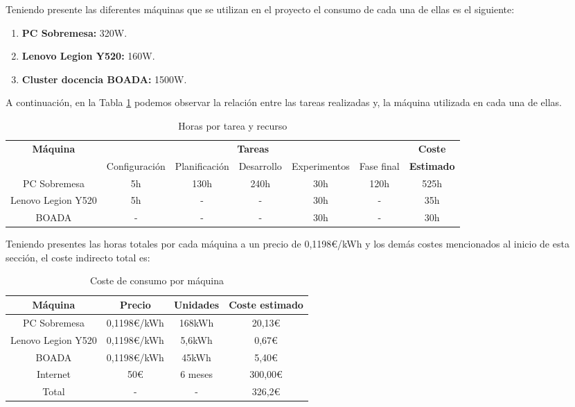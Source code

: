\documentclass[titlepage,10.5pt]{report}
\begin{document}
Teniendo presente las diferentes máquinas que se utilizan en el proyecto el consumo de cada una de ellas es el siguiente:

\begin{enumerate}
	\item \textbf{PC Sobremesa:} 320W.
	\item \textbf{Lenovo Legion Y520:} 160W.
	\item \textbf{Cluster docencia BOADA:} 1500W.
\end{enumerate}

A continuación, en la Tabla \ref{ci_1} podemos observar la relación entre las tareas realizadas y, la máquina utilizada en cada una de ellas.

\begin{table}[H]
	\centering
	\begin{tabular}{|c|c|c|c|c|c|c|}
	\hline
	\multirow{2}{*}{\textbf{Máquina}} & \multicolumn{5}{c|}{\textbf{Tareas}} & \textbf{Coste} \\ \cline{2-6} 
			& Configuración & Planificación & Desarrollo & Experimentos & Fase final & \textbf{Estimado} \\ \hline \hline
		PC Sobremesa 			& 5h  & 130h & 240h & 30h &	120h & 525h \\ \hline
		Lenovo Legion Y520 		& 5h  & -	 & -    & 30h &	-	 & 35h\\ \hline
		BOADA 					& -	  & -	 & -    & 30h &	-	 & 30h\\ \hline
	\end{tabular}
	\caption{Horas por tarea y recurso}
	\label{ci_1}
\end{table}

Teniendo presentes las horas totales por cada máquina a un precio de 0,1198€/kWh y los demás costes mencionados al inicio de esta sección, el coste indirecto total es:

\begin{table}[H]
	\centering
	\begin{tabular}{|c|c|c|c|}
		\hline
		\textbf{Máquina} & \textbf{Precio} & \textbf{Unidades} & \textbf{Coste estimado} \\ \hline \hline
		PC Sobremesa 			& 0,1198€/kWh & 168kWh 	& 20,13€ 	\\ \hline
		Lenovo Legion Y520 		& 0,1198€/kWh & 5,6kWh 	& 0,67€ 	\\ \hline
		BOADA 					& 0,1198€/kWh & 45kWh 	& 5,40€ 	\\ \hline 
		Internet				& 50€		  & 6 meses	& 300,00€ 	\\ \hline \hline
		Total 					& - 		  & -		& 326,2€	\\ \hline
	\end{tabular}
	\caption{Coste de consumo por máquina}
	\label{ci2}
\end{table}
\end{document}

